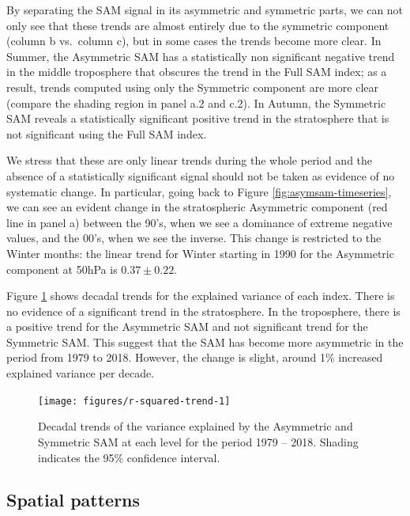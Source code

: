 \documentclass[smallextended]{svjour3}       %
\begin{document}
By separating the SAM signal in its asymmetric and symmetric parts, we can not only see that these trends are almost entirely due to the symmetric component (column b vs.~column c), but in some cases the trends become more clear. In Summer, the Asymmetric SAM has a statistically non significant negative trend in the middle troposphere that obscures the trend in the Full SAM index; as a result, trends computed using only the Symmetric component are more clear (compare the shading region in panel a.2 and c.2). In Autumn, the Symmetric SAM reveals a statistically significant positive trend in the stratosphere that is not significant using the Full SAM index.

We stress that these are only linear trends during the whole period and the absence of a statistically significant signal should not be taken as evidence of no systematic change. In particular, going back to Figure \ref{fig:asymsam-timeseries}, we can see an evident change in the stratospheric Asymmetric component (red line in panel a) between the 90's, when we see a dominance of extreme negative values, and the 00's, when we see the inverse. This change is restricted to the Winter months: the linear trend for Winter starting in 1990 for the Asymmetric component at 50hPa is \(0.37 \pm 0.22\).

Figure \ref{fig:r-squared-trend} shows decadal trends for the explained variance of each index. There is no evidence of a significant trend in the stratosphere. In the troposphere, there is a positive trend for the Asymmetric SAM and not significant trend for the Symmetric SAM. This suggest that the SAM has become more asymmetric in the period from 1979 to 2018. However, the change is slight, around 1\% increased explained variance per decade.

\begin{figure}
\texttt{[image: figures/r-squared-trend-1]} \caption{Decadal trends of the variance explained by the Asymmetric and Symmetric SAM at each level for the period 1979 -- 2018. Shading indicates the 95\% confidence interval.}\label{fig:r-squared-trend}
\end{figure}

\hypertarget{spatial}{%
\subsection{Spatial patterns}\label{spatial}}
\end{document}
